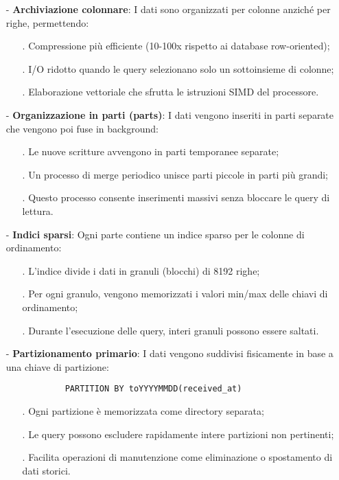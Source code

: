\documentclass[10pt]{article}
\begin{document}
        \begin{itemize}
            \item[-] \textbf{Archiviazione colonnare}: I dati sono organizzati per colonne anziché per righe, permettendo:
            \begin{itemize}
                \item[.] Compressione più efficiente (10-100x rispetto ai database row-oriented);
                \item[.] I/O ridotto quando le query selezionano solo un sottoinsieme di colonne;
                \item[.] Elaborazione vettoriale che sfrutta le istruzioni SIMD del processore.
            \end{itemize}
            
            \item[-] \textbf{Organizzazione in parti (parts)}: I dati vengono inseriti in parti separate che vengono poi fuse in background:
            \begin{itemize}
                \item[.] Le nuove scritture avvengono in parti temporanee separate;
                \item[.] Un processo di merge periodico unisce parti piccole in parti più grandi;
                \item[.] Questo processo consente inserimenti massivi senza bloccare le query di lettura.
            \end{itemize}
            
            \item[-] \textbf{Indici sparsi}: Ogni parte contiene un indice sparso per le colonne di ordinamento:
            \begin{itemize}
                \item[.] L'indice divide i dati in granuli (blocchi) di 8192 righe;
                \item[.] Per ogni granulo, vengono memorizzati i valori min/max delle chiavi di ordinamento;
                \item[.] Durante l'esecuzione delle query, interi granuli possono essere saltati.
            \end{itemize}
            
            \item[-] \textbf{Partizionamento primario}: I dati vengono suddivisi fisicamente in base a una chiave di partizione:
            \begin{lstlisting}
            PARTITION BY toYYYYMMDD(received_at)
            \end{lstlisting}
            \begin{itemize}
                \item[.] Ogni partizione è memorizzata come directory separata;
                \item[.] Le query possono escludere rapidamente intere partizioni non pertinenti;
                \item[.] Facilita operazioni di manutenzione come eliminazione o spostamento di dati storici.
            \end{itemize}
            

\end{itemize}
\end{document}

